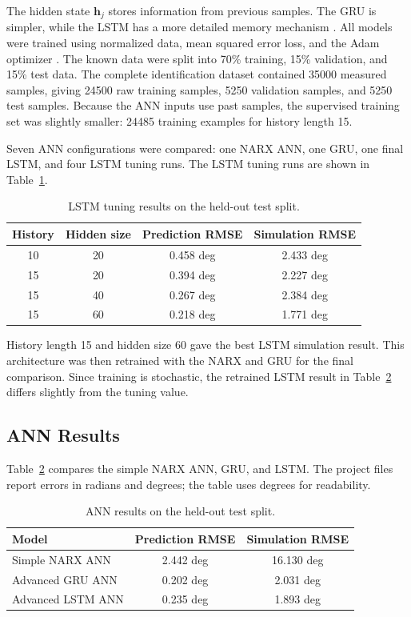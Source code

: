 The hidden state \(\mathbf{h}_j\) stores information from previous
samples. The GRU is simpler, while the LSTM has a more detailed memory
mechanism \cite{course5sc28,cho2014gru,hochreiter1997lstm}.
All models were trained using normalized data, mean squared error loss,
and the Adam optimizer \cite{kingma2014adam}. The known data were split
into 70\% training, 15\% validation, and 15\% test data. The complete
identification dataset contained 35000 measured samples, giving 24500
raw training samples, 5250 validation samples, and 5250 test samples.
Because the ANN inputs use past samples, the supervised training set was
slightly smaller: 24485 training examples for history length 15.

Seven ANN configurations were compared: one NARX ANN, one GRU, one final
LSTM, and four LSTM tuning runs. The LSTM tuning runs are shown in
Table~\ref{tab:lstm_tuning}.

\begin{table}[htbp]
\caption{LSTM tuning results on the held-out test split.}
\centering
\begin{tabular}{cccc}
\toprule
History & Hidden size & Prediction RMSE & Simulation RMSE \\
\midrule
10 & 20 & 0.458 deg & 2.433 deg \\
15 & 20 & 0.394 deg & 2.227 deg \\
15 & 40 & 0.267 deg & 2.384 deg \\
15 & 60 & 0.218 deg & 1.771 deg \\
\bottomrule
\end{tabular}
\label{tab:lstm_tuning}
\end{table}

History length 15 and hidden size 60 gave the best LSTM simulation
result. This architecture was then retrained with the NARX and GRU for
the final comparison. Since training is stochastic, the retrained LSTM
result in Table~\ref{tab:ann_results} differs slightly from the tuning
value.

\subsection{ANN Results}

Table~\ref{tab:ann_results} compares the simple NARX ANN, GRU, and
LSTM. The project files report errors in radians and degrees; the table
uses degrees for readability.

\begin{table}[htbp]
\caption{ANN results on the held-out test split.}
\centering
\begin{tabular}{lcc}
\toprule
Model & Prediction RMSE & Simulation RMSE \\
\midrule
Simple NARX ANN & 2.442 deg & 16.130 deg \\
Advanced GRU ANN & 0.202 deg & 2.031 deg \\
Advanced LSTM ANN & 0.235 deg & 1.893 deg \\
\bottomrule
\end{tabular}
\label{tab:ann_results}
\end{table}

